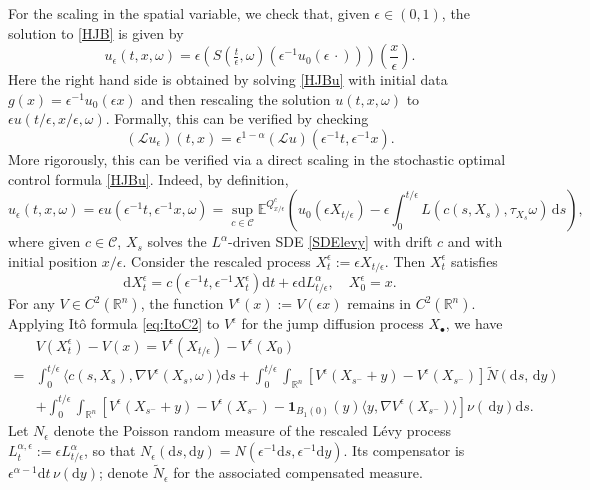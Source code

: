 \documentclass[11pt,reqno]{amsart}
\theoremstyle{definition}
\theoremstyle{remark}
\numberwithin{equation}{section}
\newcommand{\eps}{\epsilon}
\newcommand{\R}{{\mathbb{R}}}
\newcommand{\dd}{\mathrm{d}}
\begin{document}
For the scaling in the spatial variable, we check that, given $\eps \in (0,1)$, the solution to \eqref{HJB} is given by
\begin{equation}
\label{eq:uepsscale}
    u_\eps(t,x,\omega) = \eps\left(S(\tfrac{t}{\eps},\omega) (\eps^{-1}u_0(\eps \,\cdot))\right)(\frac{x}{\eps}).
\end{equation}
Here the right hand side is obtained by solving \eqref{HJBu} with initial data $g(x) = \eps^{-1}u_0(\eps x)$ and then rescaling the solution $u(t,x,\omega)$ to $\eps u(t/\eps,x/\eps,\omega)$. Formally, this can be verified by checking
\begin{equation*}
\left(\mathscr{L} u_\epsilon\right)(t,x) = \epsilon^{1-\alpha} (\mathscr{L} u)(\epsilon^{-1}t, \epsilon^{-1}x).
\end{equation*}
More rigorously, this can be verified via a direct scaling in the stochastic optimal control formula \eqref{HJBu}. Indeed, by definition, 
\begin{equation*}
u_\eps(t,x,\omega) = \eps u(\eps^{-1}t, \eps^{-1}x,\omega) = \sup_{c\in \mathscr{C}} \mathbb{E}^{Q^c_{x/\eps}}\left(u_0(\eps X_{t/\eps}) - \eps \int_0^{t/\eps} L(c(s,X_s),\tau_{X_s} \omega)\,\mathrm{d}s\right),
\end{equation*}
where given $c\in \mathscr{C}$, $X_s$ solves the $L^\alpha$-driven SDE \eqref{SDElevy} with drift $c$ and with initial position $x/\eps$. Consider the rescaled process $X^{\epsilon}_{t}:= \epsilon X_{t/\epsilon}$. Then $X^\eps_t$ satisfies
\begin{equation}
\label{eq:Xepsc}
    \mathrm{d}X^{\epsilon}_{t} = c(\epsilon^{-1}t,\epsilon^{-1}X^{\epsilon}_{t})\mathrm{d}t  + \epsilon \mathrm{d}L^{\alpha}_{t/\epsilon}, \quad X^{\epsilon}_{0} =  x.
\end{equation}
For any $V\in C^2(\R^n)$, the function $V^\eps(x):= V(\eps x)$ remains in $C^2(\R^n)$. Applying It\^{o} formula \eqref{eq:ItoC2} to $V^\eps$ for the jump diffusion process $X_\bullet$, we have
\begin{equation*}
\begin{aligned}
    & V(X^{\epsilon}_{t}) - V(x) = V^\eps(X_{t/\eps}) - V^\eps(X_0)\\
    =&\int_{0}^{t/\eps} \langle c(s, X_{s}), \nabla V^\eps(X_{s}, \omega)\rangle \mathrm{d}s  + \int_{0}^{t/\eps} \int_{\mathbb{R}^n} [V^\eps(X_{s^{-}}+ y)-V^\eps(X_{s^{-}})]\widetilde{N}(\mathrm{d}s,\,\mathrm{d}y) \nonumber \\
    & +  \int_{0}^{t/\eps} \int_{\mathbb{R}^n}[V^\eps(X_{s^{-}}+y)-V^\eps(X_{s^{-}}) - \mathbf{1}_{B_{1}(0)}(y)\langle y,\nabla V^\eps(X_{s^{-}}) \rangle ]\nu(\,\mathrm{d}y)\mathrm{d}s.
    \end{aligned}
    \end{equation*}
Let $N_\epsilon$ denote the Poisson random measure of the rescaled L\'evy process \(L_t^{\alpha,\epsilon}:=\epsilon L^\alpha_{t/\epsilon}\), so that \( N_\epsilon(\dd s,\dd y) =N(\epsilon^{-1}\dd s,\epsilon^{-1} \dd y)\).
Its compensator is $\epsilon^{\alpha-1}\mathrm{d}t\,\nu(\mathrm{d}y)$; denote $\widetilde N_\epsilon$ for the associated compensated measure.
\end{document}
